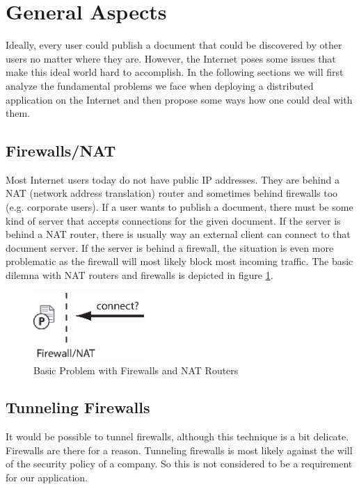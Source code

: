 \documentclass[11pt,a4paper]{article}
\begin{document}
\setlength{\parindent}{0pt}


\newpage

\tableofcontents
\newpage

\listoftables
\listoffigures
\newpage





\section{General Aspects}
Ideally, every user could publish a document that could be discovered by other users no matter where they are. However, the Internet poses some issues that make this ideal world hard to accomplish. In the following sections we will first analyze the fundamental problems we face when deploying a distributed application on the Internet and then propose some ways how one could deal with them.

\subsection{Firewalls/NAT}
Most Internet users today do not have public IP addresses. They are behind a NAT (network address translation) router and sometimes behind firewalls too (e.g. corporate users). If a user wants to publish a document, there must be some kind of server that accepts connections for the given document. If the server is behind a NAT router, there is usually way an external client can connect to that document server. If the server is behind a firewall, the situation is even more problematic as the firewall will most likely block most incoming traffic. The basic dilemna with NAT routers and firewalls is depicted in figure \ref{fig:firewall}.

\begin{figure}[H]
 \centering
 \includegraphics[width=4.2cm,height=2.6cm]{../../images/net_firewall.eps}
 \caption{Basic Problem with Firewalls and NAT Routers}
 \label{fig:firewall}
\end{figure}

\subsection{Tunneling Firewalls}
It would be possible to tunnel firewalls, although this technique is a bit delicate. Firewalls are there for a reason. Tunneling firewalls is most likely against the will of the security policy of a company. So this is not considered to be a requirement for our application.
\end{document}

